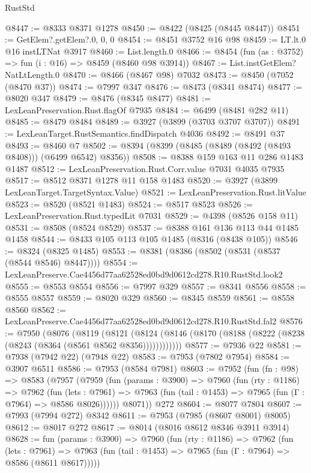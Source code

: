 \begin{lexlean}{RustStd}
\begin{coremodule}
@8447 := @8333 @8371 @1278
@8450 := @8422 (@8425 (@8445 @8447))
@8451 := GetElem?.getElem?.{0, 0, 0}
@8454 := @8451 @3752 @16 @98
@8459 := LT.lt.{0} @16 instLTNat @3917
@8460 := List.length.{0}
@8466 := @8454 (fun (as : @3752) => fun (i : @16) => @8459 (@8460 @98 @3914))
@8467 := List.instGetElem?NatLtLength.{0}
@8470 := @8466 (@8467 @98) @7032
@8473 := @8450 (@7052 (@8470 @37))
@8474 := @7997 @347
@8476 := @8473 (@8341 @8474)
@8477 := @8020 @347
@8479 := @8476 (@8345 @8477)
@8481 := LexLeanPreservation.Rust.flagOf @7935
@8484 := @6499 (@8481 @282 @11)
@8485 := @8479 @8484
@8489 := @3927 (@3899 (@3703 @3707 @3707))
@8491 := LexLeanTarget.RustSemantics.findDispatch @4036
@8492 := @8491 @37
@8493 := @8460 @7
@8502 := @8394 (@8399 (@8485 (@8489 (@8492 (@8493 @8408))) (@6499 @6542) @8356))
@8508 := @8388 @159 @163 @11 @286 @1483 @1487
@8512 := LexLeanPreservation.Rust.Corr.value @7031 @4035 @7935
@8517 := @8512 @8371 @1278 @11 @158 @1483
@8520 := @3927 (@3899 LexLeanTarget.TargetSyntax.Value)
@8521 := LexLeanPreservation.Rust.litValue
@8523 := @8520 (@8521 @1483)
@8524 := @8517 @8523
@8526 := LexLeanPreservation.Rust.typedLit @7031
@8529 := @4398 (@8526 @158 @11)
@8531 := @8508 (@8524 @8529)
@8537 := @8388 @161 @136 @113 @44 @1485 @1458
@8544 := @8433 @105 @113 @105 @1485 (@8316 (@8438 @105))
@8546 := @8324 (@8325 @1485)
@8553 := @8381 (@8386 (@8502 (@8531 (@8537 (@8544 @8546) @8447))))
@8554 := LexLeanPreserve.Cae4456d77aa62528ed0bd9d0612cd278.R10.RustStd.look2
@8555 := @8553 @8554
@8556 := @7997 @329
@8557 := @8341 @8556
@8558 := @8555 @8557
@8559 := @8020 @329
@8560 := @8345 @8559
@8561 := @8558 @8560
@8562 := LexLeanPreserve.Cae4456d77aa62528ed0bd9d0612cd278.R10.RustStd.fal2
@8576 := @7950
    (@8076
      (@8119
        (@8121
          (@8124 (@8146 (@8170 (@8188 (@8222 (@8238 (@8243 (@8364 (@8561 @8562 @8356))))))))))))
@8577 := @7936 @22
@8581 := @7938 (@7942 @22) (@7948 @22)
@8583 := @7953 (@7802 @7954)
@8584 := @3907 @6511
@8586 := @7953 (@8584 @7981)
@8603 := @7952
    (fun (fn : @98) =>
    @8583
      (@7957
        (@7959
          (fun (params : @3900) =>
          @7960
            (fun (rty : @1186) =>
            @7962
              (fun (lets : @7961) =>
              @7963 (fun (tail : @1453) => @7965 (fun (Γ : @7964) => @8586 @8026))))))
        @8071))
    @272
@8604 := @8077 @7804
@8607 := @7993 (@7994 @272) @8342
@8611 := @7953 (@7985 (@8607 @8001) @8005)
@8612 := @8017 @272
@8617 := @8014 (@8016 @8612 @8346 @3911 @3914)
@8628 := fun (params : @3900) =>
  @7960
    (fun (rty : @1186) =>
    @7962
      (fun (lets : @7961) =>
      @7963 (fun (tail : @1453) => @7965 (fun (Γ : @7964) => @8586 (@8611 @8617)))))

\end{coremodule}
\end{lexlean}
